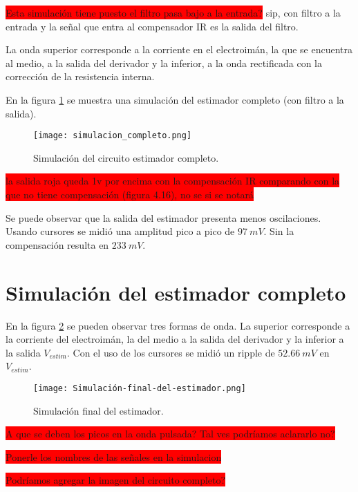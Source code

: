 \colorbox{red}{Esta simulación tiene puesto el filtro pasa bajo a la entrada?} sip, con filtro a la entrada y la señal que entra al compensador IR es la salida del filtro.

La onda superior corresponde a la corriente en el electroimán, la que se encuentra al medio, a la salida del derivador y la inferior, a la onda rectificada con la corrección de la resistencia interna.

En la figura \ref{fig:img_simulacion_completo} se muestra una simulación del estimador completo (con filtro a la salida).

\begin{figure}[H]
	\centering
	\texttt{[image: simulacion\_completo.png]}
	\caption{Simulación del circuito estimador completo.}
	\label{fig:img_simulacion_completo}
\end{figure}
\colorbox{red}{la salida roja queda 1v por encima con la compensación IR comparando con la que no tiene compensación (figura 4.16), no se si se notará}

Se puede observar que la salida del estimador presenta menos oscilaciones. Usando cursores se midió una amplitud pico a pico de $97\:mV$. Sin la compensación resulta en $233\:mV$.

\section{Simulación del estimador completo}

En la figura \ref{fig:img_Simulación_final_del_estimado} se pueden observar tres formas de onda. La superior corresponde a la corriente del electroimán, la del medio a la salida del derivador y la inferior a la salida $V_{estim}$. Con el uso de los cursores se midió un ripple de $52.66\:mV $ en $V_{estim}$.

\begin{figure}[H]
	\centering
	\texttt{[image: Simulación-final-del-estimador.png]}
	\caption{Simulación final del estimador.}
	\label{fig:img_Simulación_final_del_estimado}
\end{figure}

\colorbox{red}{A que se deben los picos en la onda pulsada? Tal ves podríamos aclararlo no?}


\colorbox{red}{Ponerle los nombres de las señales en la simulacion}


\colorbox{red}{Podríamos agregar la imagen del circuito completo?}



